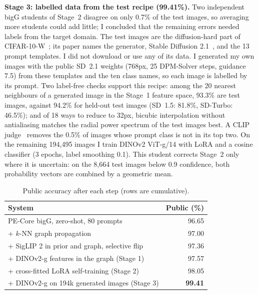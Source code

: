 \documentclass[10pt,twocolumn,letterpaper]{article}
\newcommand{\head}[1]{\par\vspace{0.5pt}\noindent\textbf{#1}}
\begin{document}
\head{Stage 3: labelled data from the test recipe (99.41\%).}
Two independent bigG students of Stage~2 disagree on only 0.7\% of the test images, so averaging more students could add little; I concluded that the remaining errors needed labels from the target domain.
The test images are the diffusion-hard part of CIFAR-10-W~\cite{sun2024cifar10w}; its paper names the generator, Stable Diffusion 2.1~\cite{rombach2022ldm}, and the 13 prompt templates.
I did not download or use any of its data.
I generated my own images with the public SD~2.1 weights (768px, 25 DPM-Solver steps, guidance 7.5) from these templates and the ten class names, so each image is labelled by its prompt.
Two label-free checks support this recipe: among the 20 nearest neighbours of a generated image in the Stage~1 feature space, 93.3\% are test images, against 94.2\% for held-out test images (SD~1.5: 81.8\%, SD-Turbo: 46.5\%); and of 18 ways to reduce to 32px, bicubic interpolation without antialiasing matches the radial power spectrum of the test images best.
A CLIP judge~\cite{fang2024dfn} removes the 0.5\% of images whose prompt class is not in its top two.
On the remaining 194,495 images I train DINOv2 ViT-g/14 with LoRA and a cosine classifier (3 epochs, label smoothing 0.1).
This student corrects Stage~2 only where it is uncertain: on the 8,664 test images below 0.9 confidence, both probability vectors are combined by a geometric mean.

\begin{table}[t]
\centering\small
\setlength{\tabcolsep}{4pt}
\begin{tabular}{@{}lr@{}}
\toprule
System & Public (\%) \\
\midrule
PE-Core bigG, zero-shot, 80 prompts & 96.65 \\
\quad + $k$-NN graph propagation & 97.00 \\
\quad + SigLIP 2 in prior and graph, selective flip & 97.36 \\
\quad + DINOv2-g features in the graph \hfill (Stage 1) & 97.57 \\
\quad + cross-fitted LoRA self-training \hfill (Stage 2) & 98.05 \\
\quad + DINOv2-g on 194k generated images \hfill (Stage 3) & \textbf{99.41} \\
\bottomrule
\end{tabular}
\vspace{-2mm}
\caption{Public accuracy after each step (rows are cumulative).}
\label{tab:stages}
\vspace{-3mm}
\end{table}
\end{document}
